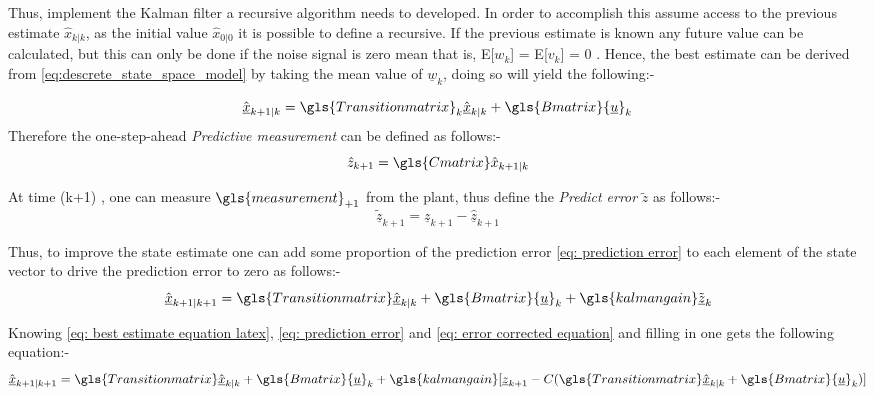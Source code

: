 Thus, implement the Kalman filter a recursive algorithm  needs to developed. In order to accomplish this assume access to the previous estimate $\hat{x}_{k|k}$, as the initial value $\hat{x}_{0|0}$ it is possible to define a recursive. If the previous estimate is known any future value can be calculated, but this can only be done if the noise signal is zero mean that is, E[$w_k$] = E[$v_k$] = 0 . Hence, the best estimate can be derived from \eqref{eq:descrete_state_space_model} by taking the mean value of $\underline{w}_k$, doing so will yield the following:-

\begin{equation}
\hat{\underline{x}}_{k+1|k} =\gls{Transitionmatrix}_k\hat{\underline{x}}_{k|k} + \gls{Bmatrix} {\underline{u}}_k
\label{eq: best estimate equation latex}
\end{equation}
Therefore the one-step-ahead  \textit{Predictive measurement} can be defined as follows:-
\begin{equation*}
\hat{z}_{k+1} = \gls{Cmatrix}\hat{x}_{k+1|k}
\end{equation*}

At time (k+1) , one can measure $\gls{measurement}_{+1}$ from the plant, thus define the \textit{Predict error} $\tilde{z}$ as follows:-
\begin{equation}
\tilde{\underline{z}}_{k+1} = {\underline{z}}_{k+1 }- \hat{\underline{z}}_{k+1}
\label{eq: prediction error}
\end{equation}

Thus, to improve the state estimate one can add some proportion of the prediction error \eqref{eq: prediction error} to each element of the state vector to drive the prediction error to zero as follows:-
\begin{equation}
\hat{\underline{x}}_{k+1|k+1}  = \gls{Transitionmatrix}\hat{\underline{x}}_{k|k} +\gls{Bmatrix} {\underline{u}}_k+ \gls{kalmangain}\tilde{\underline{z}}_k
\label{eq: error corrected equation}
\end{equation}

Knowing \eqref {eq: best estimate equation latex},  \eqref{eq: prediction error} and \eqref{eq: error corrected equation} and filling in one gets the following equation:-
\begin{equation}
\hat{\underline{x}}_{k+1|k+1} = \gls{Transitionmatrix}\hat{\underline{x}}_{k|k} +\gls{Bmatrix}{\underline{u}}_{k} + \gls{kalmangain} [{\underline{z}}_{k+1} - { C}(\gls{Transitionmatrix} \hat{\underline{x}}_{k|k} + \gls{Bmatrix}{\underline{u} }_k) ] \label{eq : kalman gain from art of control long}
\end{equation}

